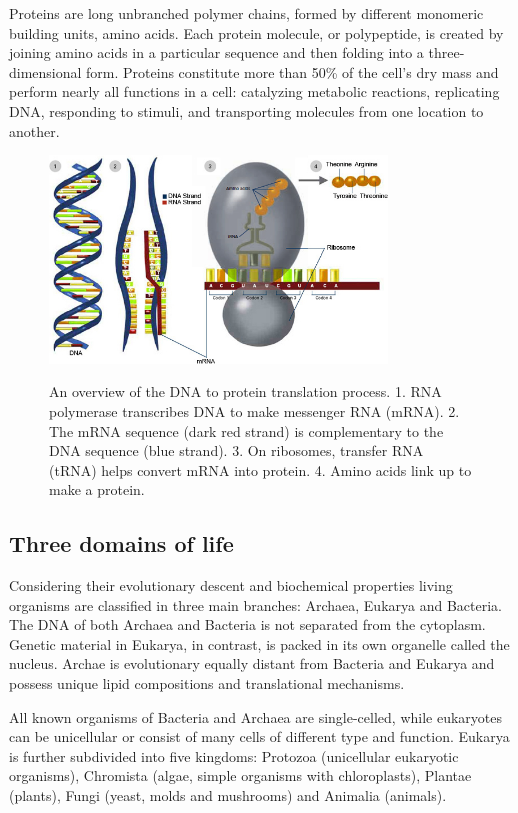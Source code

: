 \documentclass[11pt, a4paper,oneside]{report}
\begin{document}
Proteins are long unbranched polymer chains, formed by different monomeric building units, amino acids. Each protein molecule, or polypeptide, is created by joining amino acids in a particular sequence and then folding into a three-dimensional form. Proteins constitute more than 50\%  of the cell's dry mass \cite{Alberts2007} and perform nearly all functions in a cell: catalyzing metabolic reactions, replicating DNA, responding to stimuli, and transporting molecules from one location to another.
\begin{figure}[ht]
\begin{center}
\label{img:dnatoprotein}
\includegraphics[width=0.8\textwidth]{figures/dna_to_protein.jpg}
\end{center}
\caption{An overview of the DNA to protein translation process. 1. RNA polymerase transcribes DNA to make messenger RNA (mRNA). 2. The mRNA sequence (dark red strand) is complementary to the DNA sequence (blue strand). 3. On ribosomes, transfer RNA (tRNA) helps convert mRNA into protein. 4. Amino acids link up to make a protein.} 
\end{figure}

\subsection{Three domains of life}
Considering their evolutionary descent and biochemical properties  living organisms are classified in three main branches: Archaea, Eukarya and Bacteria. The DNA of both Archaea and Bacteria is not separated from the cytoplasm. Genetic material in Eukarya, in contrast, is packed in its own organelle called the nucleus. Archae is evolutionary equally distant from Bacteria and Eukarya and possess unique lipid compositions and translational mechanisms. 

All known organisms of Bacteria and Archaea are single-celled, while eukaryotes can be unicellular or consist of many cells of different type and function. Eukarya is further subdivided into five kingdoms: Protozoa (unicellular eukaryotic organisms), Chromista (algae, simple organisms with chloroplasts), Plantae (plants), Fungi (yeast, molds and mushrooms) and Animalia (animals).    
\end{document}
